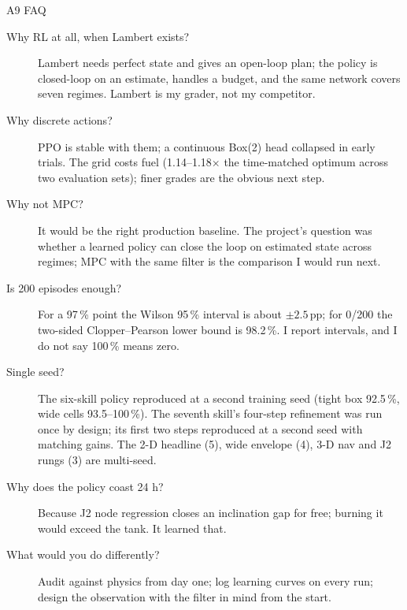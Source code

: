 \documentclass[aspectratio=169,11pt]{beamer}
\begin{document}
\begin{frame}{A9 \; FAQ}
\scriptsize
\begin{description}
  \item[Why RL at all, when Lambert exists?] Lambert needs perfect state and gives an open-loop plan; the policy is closed-loop on an estimate, handles a budget, and the same network covers seven regimes. Lambert is my grader, not my competitor.
  \item[Why discrete actions?] PPO is stable with them; a continuous Box(2) head collapsed in early trials. The grid costs fuel (1.14--1.18$\times$ the time-matched optimum across two evaluation sets); finer grades are the obvious next step.
  \item[Why not MPC?] It would be the right production baseline. The project's question was whether a learned policy can close the loop on estimated state across regimes; MPC with the same filter is the comparison I would run next.
  \item[Is 200 episodes enough?] For a 97\,\% point the Wilson 95\,\% interval is about $\pm2.5$\,pp; for 0/200 the two-sided Clopper--Pearson lower bound is 98.2\,\%. I report intervals, and I do not say 100\,\% means zero.
  \item[Single seed?] The six-skill policy reproduced at a second training seed (tight box 92.5\,\%, wide cells 93.5--100\,\%). The seventh skill's four-step refinement was run once by design; its first two steps reproduced at a second seed with matching gains. The 2-D headline (5), wide envelope (4), 3-D nav and J2 rungs (3) are multi-seed.
  \item[Why does the policy coast 24 h?] Because J2 node regression closes an inclination gap for free; burning it would exceed the tank. It learned that.
  \item[What would you do differently?] Audit against physics from day one; log learning curves on every run; design the observation with the filter in mind from the start.
\end{description}
\end{frame}
\end{document}
